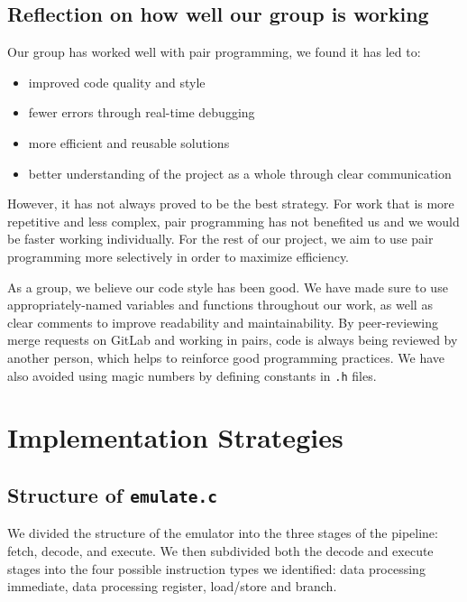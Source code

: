 \documentclass[11pt]{article}
\begin{document}
\subsection{Reflection on how well our group is working}
Our group has worked well with pair programming, we found it has led to:
\begin{itemize}
    \item improved code quality and style
    \item fewer errors through real-time debugging
    \item more efficient and reusable solutions
    \item better understanding of the project as a whole through clear communication
\end{itemize}
However, it has not always proved to be the best strategy. For work that is more repetitive and less complex, pair programming has not benefited us and we would be faster working individually. For the rest of our project, we aim to use pair programming more selectively in order to maximize efficiency.

As a group, we believe our code style has been good. We have made sure to use appropriately-named variables and functions throughout our work, as well as clear comments to improve readability and maintainability. By peer-reviewing merge requests on GitLab and working in pairs, code is always being reviewed by another person, which helps to reinforce good programming practices. We have also avoided using magic numbers by defining constants in \texttt{.h} files.

\section{Implementation Strategies}

\subsection{Structure of \texttt{emulate.c}}

We divided the structure of the emulator into the three stages of the pipeline: fetch, decode, and execute. We then subdivided both the decode and execute stages into the four possible instruction types we identified: data processing immediate, data processing register, load/store and branch. 
\end{document}
